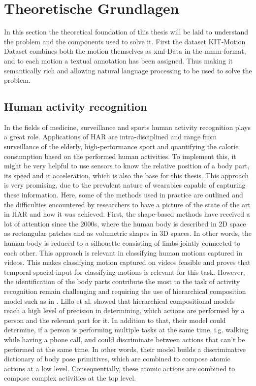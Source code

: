 \chapter{Theoretische Grundlagen}
In this section the theoretical foundation of this thesis will be laid to understand the problem and the components used to solve it. First the dataset KIT-Motion Dataset combines both the motion themselves as xml-Data in the mmm-format, and to each motion a textual annotation has been assigned. Thus making it semantically rich and allowing natural language processing to be used to solve the problem.
\section{Human activity recognition}\label{sec:HAR}
In the fields of medicine, surveillance and sports human activity recognition plays a great role. Applications of HAR are intra-disciplined and range from surveillance of the elderly, high-performance sport and quantifying the calorie consumption based on the performed human activities. To implement this, it might be very helpful to use sensors to know the relative position of a body part, its speed and it acceleration, which is also the base for this thesis. This approach is very promising, due to the prevalent nature of wearables capable of capturing these information. Here, some of the methods used in practice are outlined and the difficulties encountered by researchers to have a picture of the state of the art in HAR and how it was achieved.\newline
First, the shape-based methods have received a lot of attention since the 2000s, where the human body is described in 2D space as rectangular patches and as volumetric shapes in 3D spaces. In other words, the human body is reduced to a silhouette consisting of limbs jointly connected to each other. This approach is relevant in classifying human motions captured in videos\cite{vrigkas2015review}. This makes classifying motion captured on videos feasible and proves that temporal-spacial input for classifying motions is relevant for this task. However, the identification of the body parts contribute the most to the task of activity recognition remain challenging and requiring the use of hierarchical composition model such as in \cite{lillo2014discriminative}. Lillo et al. showed that hierarchical compositional models reach a high level of precision in determining, which actions are performed by a person and the relevant part for it. In addition to that, their model could determine, if a person is performing multiple tasks at the same time, i.g. walking while having a phone call, and could discriminate between actions that can't be performed at the same time. In other words, their model builds a discriminative dictionary of body pose primitives, which are combined to compose atomic actions at a low level. Consequentially, these atomic actions are combined to compose complex activities at the top level\cite{lillo2014discriminative}.\newline
